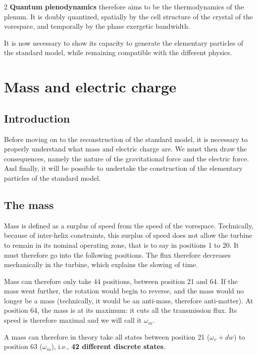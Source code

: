 \begin{multicols}{2}
	\textbf{Quantum plenodynamics} therefore aims to be the thermodynamics of 
	the plenum. It is doubly quantized, spatially by the cell structure 
	of the crystal of the vorespace, and temporally by the 
	phase exergetic bandwidth.
	
	It is now necessary to show its capacity to generate the 
	elementary particles of the standard model, while remaining compatible with the 
	different physics.
	
	\section{Mass and electric charge}
	
	\subsection{Introduction}
	
	Before moving on to the reconstruction of the standard model, it is necessary to 
	properly understand what mass and electric charge are. We must 
	then draw the consequences, namely the nature of the 
	gravitational force and the electric force. And finally, it will be 
	possible to undertake the construction of the elementary particles of the 
	standard model.
	
	\subsection{The mass}
	
	Mass is defined as a surplus of speed from the 
	speed of the vorespace. Technically, because of inter-helix 
	constraints, this surplus of speed does not allow the turbine to 
	remain in its nominal operating zone, that is to say in positions 1 to 
	20. It must therefore go into the following positions. The 
	flux therefore decreases mechanically in the turbine, which explains the 
	slowing of time.
	
	Mass can therefore only take 44 positions, between position 21 
	and 64. If the mass went further, the rotation would begin to 
	reverse, and the mass would no longer be a mass (technically, it 
	would be an anti-mass, therefore anti-matter). At position 64, the 
	mass is at its maximum: it cuts all the transmission flux. Its 
	speed is therefore maximal and we will call it $\omega_m$.
	
	A mass can therefore in theory take all states between 
	position 21 ($\omega_v + dw$) to position 63 ($\omega_m$), i.e., \textbf{42 different discrete 
		states}.
	\medskip
	

\end{multicols}
